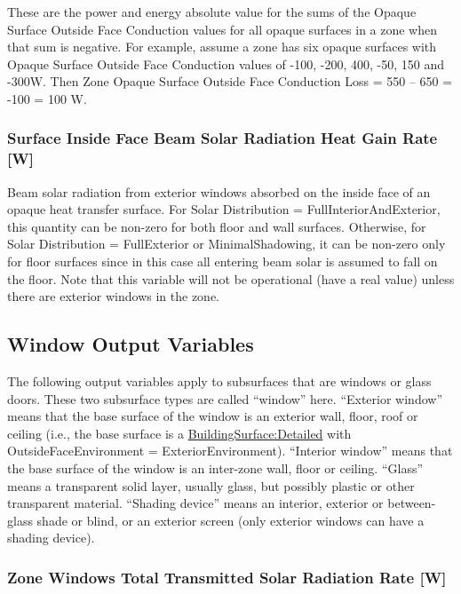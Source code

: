 These are the power and energy absolute value for the sums of the Opaque Surface Outside Face Conduction values for all opaque surfaces in a zone when that sum is negative. For example, assume a zone has six opaque surfaces with Opaque Surface Outside Face Conduction values of -100, -200, 400, -50, 150 and -300W. Then Zone Opaque Surface Outside Face Conduction Loss = \textbar{}550 -- 650\textbar{} = \textbar{}-100\textbar{} = 100 W.

\subsubsection{Surface Inside Face Beam Solar Radiation Heat Gain Rate {[}W{]}}\label{surface-inside-face-beam-solar-radiation-heat-gain-rate-w}

Beam solar radiation from exterior windows absorbed on the inside face of an opaque heat transfer surface. For Solar Distribution = FullInteriorAndExterior, this quantity can be non-zero for both floor and wall surfaces. Otherwise, for Solar Distribution = FullExterior or MinimalShadowing, it can be non-zero only for floor surfaces since in this case all entering beam solar is assumed to fall on the floor. Note that this variable will not be operational (have a real value) unless there are exterior windows in the zone.

\subsection{Window Output Variables}\label{window-output-variables-1}

The following output variables apply to subsurfaces that are windows or glass doors. These two subsurface types are called ``window'' here. ``Exterior window'' means that the base surface of the window is an exterior wall, floor, roof or ceiling (i.e., the base surface is a \hyperref[buildingsurfacedetailed]{BuildingSurface:Detailed} with OutsideFaceEnvironment = ExteriorEnvironment). ``Interior window'' means that the base surface of the window is an inter-zone wall, floor or ceiling. ``Glass'' means a transparent solid layer, usually glass, but possibly plastic or other transparent material. ``Shading device'' means an interior, exterior or between-glass shade or blind, or an exterior screen (only exterior windows can have a shading device).

\subsubsection{Zone Windows Total Transmitted Solar Radiation Rate {[}W{]}}\label{zone-windows-total-transmitted-solar-radiation-rate-w}

